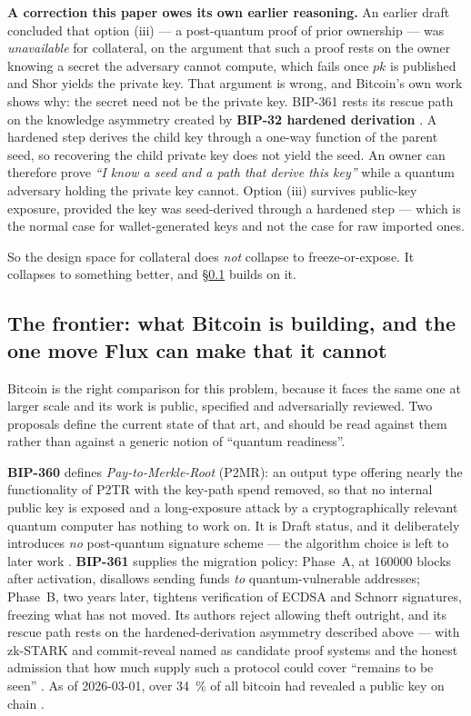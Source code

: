 \begin{remark}
\textbf{A correction this paper owes its own earlier reasoning.} An earlier draft concluded that
option (iii) --- a post-quantum proof of prior ownership --- was \emph{unavailable} for
\FluxNode{} collateral, on the argument that such a proof rests on the owner knowing a secret the
adversary cannot compute, which fails once $pk$ is published and Shor yields the private key. That
argument is wrong, and Bitcoin's own work shows why: the secret need not be the private key.
BIP-361 rests its rescue path on the knowledge asymmetry created by \textbf{BIP-32 hardened
derivation} \citep{bip361}. A hardened step derives the child key through a one-way function of the
parent seed, so recovering the child private key does not yield the seed. An owner can therefore
prove \emph{``I know a seed and a path that derive this key''} while a quantum adversary holding the
private key cannot. Option (iii) survives public-key exposure, provided the key was seed-derived
through a hardened step --- which is the normal case for wallet-generated keys and not the case for
raw imported ones.

So the design space for \FluxNode{} collateral does \emph{not} collapse to freeze-or-expose. It
collapses to something better, and \S\ref{sec:pq-frontier} builds on it.
\end{remark}

\subsection{The frontier: what Bitcoin is building, and the one move Flux can make that it cannot}
\label{sec:pq-frontier}

Bitcoin is the right comparison for this problem, because it faces the same one at larger scale and
its work is public, specified and adversarially reviewed. Two proposals define the current state of
that art, and \Flux{} should be read against them rather than against a generic notion of
``quantum readiness''.

\textbf{BIP-360} defines \emph{Pay-to-Merkle-Root} (P2MR): an output type offering nearly the
functionality of P2TR with the key-path spend removed, so that no internal public key is exposed and
a long-exposure attack by a cryptographically relevant quantum computer has nothing to work on. It is
Draft status, and it deliberately introduces \emph{no} post-quantum signature scheme --- the
algorithm choice is left to later work \citep{bip360}. \textbf{BIP-361} supplies the migration
policy: Phase~A, at \num{160000} blocks after activation, disallows sending funds \emph{to}
quantum-vulnerable addresses; Phase~B, two years later, tightens verification of ECDSA and Schnorr
signatures, freezing what has not moved. Its authors reject allowing theft outright, and its rescue
path rests on the hardened-derivation asymmetry described above --- with zk-STARK and commit-reveal
named as candidate proof systems and the honest admission that how much supply such a protocol could
cover ``remains to be seen'' \citep{bip361}. As of 2026-03-01, over \SI{34}{\percent} of all bitcoin
had revealed a public key on chain \srcinferred.

